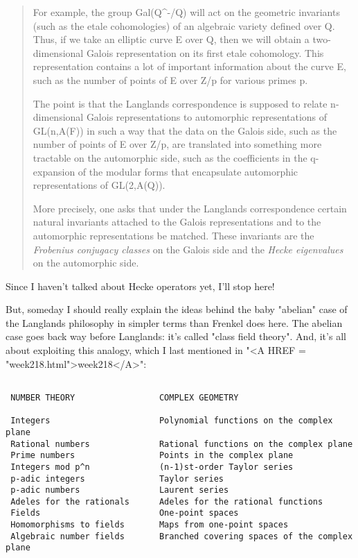 \begin{quote}
  For example, the group Gal(Q^{-}/Q) will act on the geometric
  invariants (such as the etale cohomologies) of an algebraic variety
  defined over Q.  Thus, if we take an elliptic curve E over Q,
  then we will obtain a two-dimensional Galois representation on its
  first etale cohomology.  This representation contains a lot of
  important information about the curve E, such as the number of
  points of E over Z/p for various primes p.

  The point is that the Langlands correspondence is supposed to 
  relate n-dimensional Galois representations to automorphic 
  representations of GL(n,A(F)) in such a way that the data on 
  the Galois side, such as the number of points of E over Z/p, 
  are translated into something more tractable on the automorphic 
  side, such as the coefficients in the q-expansion of the modular 
  forms that encapsulate automorphic representations of GL(2,A(Q)).

  More precisely, one asks that under the Langlands correspondence
  certain natural invariants attached to the Galois representations 
  and to the automorphic representations be matched. These 
  invariants are the \emph{Frobenius conjugacy classes} on the Galois 
  side and the \emph{Hecke eigenvalues} on the automorphic side. 
\end{quote}

Since I haven't talked about Hecke operators yet, I'll stop here!

But, someday I should really explain the ideas behind the baby 
"abelian" case of the Langlands philosophy in simpler terms than 
Frenkel does here.  The abelian case goes back way before Langlands:
it's called "class field theory".  And, it's all about exploiting 
this analogy, which I last mentioned in "<A HREF = "week218.html">week218</A>":


\begin{verbatim}

 NUMBER THEORY                 COMPLEX GEOMETRY                                 

 Integers                      Polynomial functions on the complex plane
 Rational numbers              Rational functions on the complex plane
 Prime numbers                 Points in the complex plane            
 Integers mod p^n              (n-1)st-order Taylor series
 p-adic integers               Taylor series
 p-adic numbers                Laurent series
 Adeles for the rationals      Adeles for the rational functions
 Fields                        One-point spaces
 Homomorphisms to fields       Maps from one-point spaces
 Algebraic number fields       Branched covering spaces of the complex plane
                                       
\end{verbatim}
    


